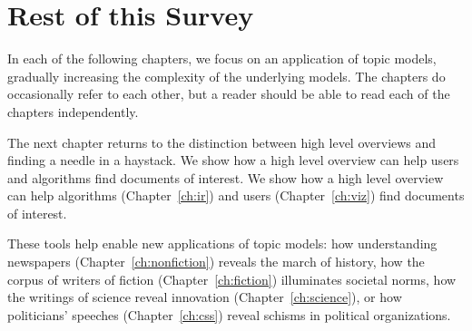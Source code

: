 \section{Rest of this Survey}


In each of the following chapters, we focus on an application of topic
models, gradually increasing the complexity of the underlying models.
The chapters do occasionally refer to each other, but a reader should
be able to read each of the chapters independently.

The next chapter returns to the distinction between high level
overviews and finding a needle in a haystack.  We show how a high
level overview can help users and algorithms find documents of
interest.  We show how a high level overview can help
algorithms (Chapter~\ref{ch:ir}) and users (Chapter~\ref{ch:viz}) find documents
of interest.

These tools help enable new applications of topic models: how
understanding newspapers (Chapter~\ref{ch:nonfiction}) reveals the
march of history, how the corpus of writers of fiction
(Chapter~\ref{ch:fiction}) illuminates societal norms, how the
writings of science reveal innovation (Chapter~\ref{ch:science}), or
how politicians' speeches (Chapter~\ref{ch:css}) reveal schisms in
political organizations.
